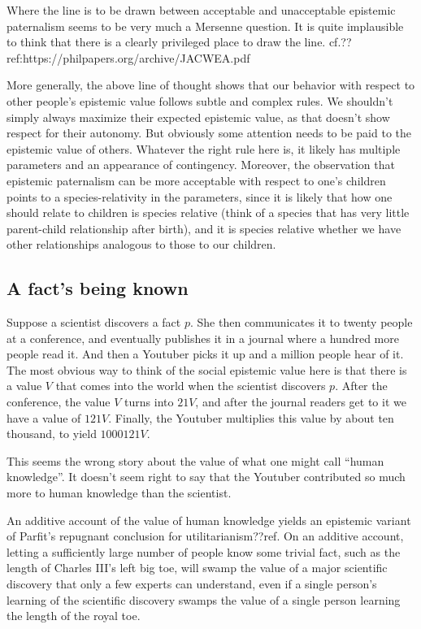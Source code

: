 Where the line is to be drawn between acceptable and unacceptable epistemic paternalism seems to be very
much a Mersenne question. It is quite implausible to think that there is a clearly privileged place to draw
the line. cf.??ref:https://philpapers.org/archive/JACWEA.pdf

More generally, the above line of thought shows that our behavior with respect to other people's epistemic
value follows subtle and complex rules. We shouldn't simply always maximize their expected epistemic value, as that
doesn't show respect for their autonomy. But obviously some attention needs to be paid to the epistemic value of
others.
Whatever the right rule here is, it likely has multiple parameters and an appearance of contingency. 
Moreover, the observation that epistemic paternalism can be more acceptable with respect to one's children points
to a species-relativity in the parameters, since it is likely that how one should relate to children is species
relative (think of a species that has very little parent-child relationship after birth), and it is species relative
whether we have other relationships analogous to those to our children.

\subsection{A fact's being known}
Suppose a scientist discovers a fact $p$. She then communicates it to twenty people at a conference,
and eventually publishes it in a journal where a hundred more people read it. And then a Youtuber picks it up and
a million people hear of it. The most obvious way to think of the social epistemic value here is that there
is a value $V$ that comes into the world when the scientist discovers $p$. After the conference, the value
$V$ turns into $21V$, and after the journal readers get to it we have a value of $121V$. Finally, the Youtuber
multiplies this value by about ten thousand, to yield $1000121V$. 

This seems the wrong story about the value of what one might call ``human knowledge''. It doesn't seem
right to say that the Youtuber contributed so much more to human knowledge than the scientist. 

An additive account of the value of human knowledge yields an epistemic variant of Parfit's repugnant conclusion
for utilitarianism??ref. On an additive account, letting a sufficiently large number of people know some trivial
fact, such as the length of Charles III's left big toe, will swamp the value of a major scientific discovery that only a few experts can understand, even if a single person's learning of the scientific discovery swamps the value of a single
person learning the length of the royal toe.

